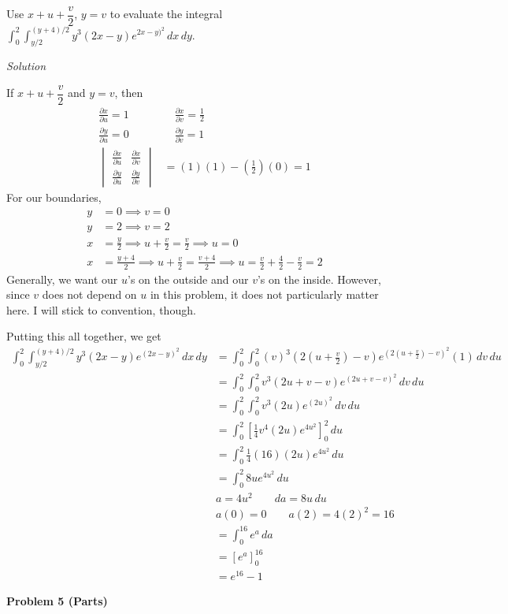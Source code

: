 \documentclass{article}
\newcommand{\lrp}[1]{\left( #1 \right)}
\newcommand{\lrb}[1]{\left[ #1 \right]}
\newcommand{\Solution}{\textit{Solution}}
\begin{document}
Use $x+u+\dfrac{v}{2}$, $y=v$ to evaluate the integral $\displaystyle \int_0^2\int_{y/2}^{(y+4)/2} y^3(2x-y)e^{2x-y)^2}\,dx\,dy$.

\Solution

If $x+u+\dfrac{v}{2}$ and $y=v$, then
\begin{align*}
    \frac{\partial x}{\partial u}=1&\hspace{1em}
    \frac{\partial x}{\partial v}=\frac{1}{2}\\
    \frac{\partial y}{\partial u}=0&\hspace{1em}
    \frac{\partial y}{\partial v}=1\\
    \begin{vmatrix}
    \frac{\partial x}{\partial u} & \frac{\partial x}{\partial v}\\
    \frac{\partial y}{\partial u} & 
    \frac{\partial y}{\partial v}
    \end{vmatrix}&= (1)(1)-\lrp{\frac{1}{2}}(0)= 1
\end{align*}
For our boundaries,
\begin{align*}
    y&=0\implies v=0\\
    y&=2\implies v=2\\
    x&=\frac{y}{2}\implies u+\frac{v}{2}=\frac{v}{2}\implies u =0\\
    x&=\frac{y+4}{2}\implies u+\frac{v}{2}=\frac{v+4}{2}\implies u = \frac{v}{2}+\frac{4}{2}-\frac{v}{2}=2
\end{align*}
Generally, we want our $u$'s on the outside and our $v$'s on the inside. However, since $v$ does not depend on $u$ in this problem, it does not particularly matter here. I will stick to convention, though.

Putting this all together, we get
\begin{align*}
    \int_0^2\int_{y/2}^{(y+4)/2} y^3(2x-y)e^{(2x-y)^2}\,dx\,dy &= \int_0^2 \int_0^2 (v)^3 \lrp{2\lrp{u+\frac{v}{2}}-v}e^{\lrp{2\lrp{u+\frac{v}{2}}-v}^2}(1)\,dv\,du\\
    &=\int_0^2\int_0^2 v^3 (2u + v-v)e^{(2u+v-v)^2}\,dv\,du\\
    &=\int_0^2\int_0^2 v^3 (2u)e^{(2u)^2}\,dv\,du\\
    &=\int_0^2 \lrb{\frac{1}{4}v^4(2u)e^{4u^2}}_0^2\,du\\
    &=\int_0^2 \frac{1}{4}(16)(2u)e^{4u^2}\,du\\
    &=\int_0^2 8ue^{4u^2}\,du\\
    & a = 4u^2 \hspace{2em} da= 8u\,du\\
    & a(0)= 0 \hspace{2em} a(2) = 4(2)^2=16\\
    & =\int_0^{16} e^a\,da\\
    &=\lrb{e^a}_0^{16}\\
    &= \boxed{e^{16}-1}
\end{align*}
{}\textbf{Problem 5 (Parts)}
\end{document}
